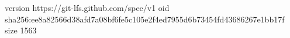 version https://git-lfs.github.com/spec/v1
oid sha256:ee8a82566d38afd7a08bf6fe5c105e2f4ed7955d6b73454fd43686267e1bb17f
size 1563
